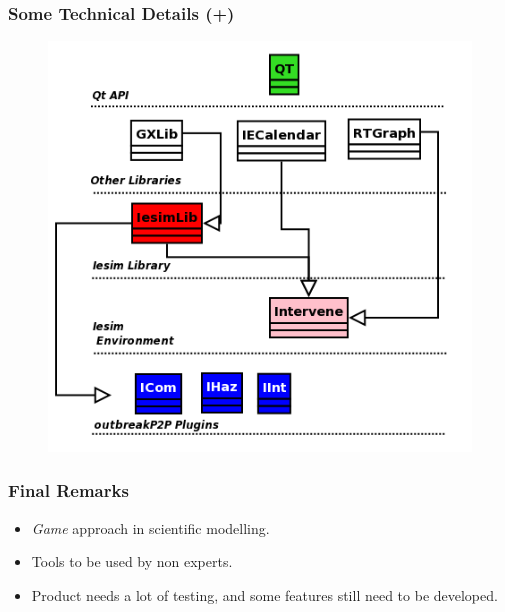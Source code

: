\documentclass[hyperref={pdfpagelabels=true}]{beamer}
\begin{document}
\begin{frame}
\frametitle{Some Technical Details (+)}
\begin{figure}
\includegraphics[scale=0.25]{intervene2.png}
\end{figure}
\end{frame}

\begin{frame}
\frametitle{Final Remarks}
\begin{itemize}
\item \textit{Game} approach in scientific modelling.
\item Tools to be used by non experts.
\item Product needs a lot of testing, and some features still need to be developed.
\end{itemize}
\end{frame}
\end{document}
